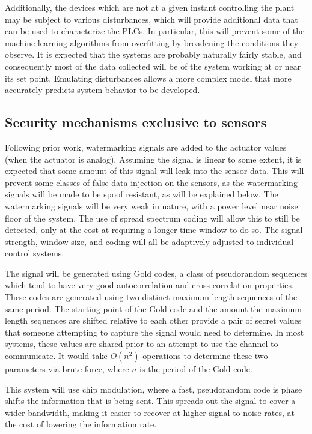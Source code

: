 \documentclass[10pt,twocolumn]{IEEEtran}
\begin{document}
Additionally, the devices which are not at a given instant controlling the plant may be subject to various disturbances, which will provide additional data that can be used to characterize the PLCs.
In particular, this will prevent some of the machine learning algorithms from overfitting by broadening the conditions they observe.
It is expected that the systems are probably naturally fairly stable, and consequently most of the data collected will be of the system working at or near its set point.
Emulating disturbances allows a more complex model that more accurately predicts system behavior to be developed.

\subsection{Security mechanisms exclusive to sensors}
Following prior work, watermarking signals are added to the actuator values (when the actuator is analog).
Assuming the signal is linear to some extent, it is expected that some amount of this signal will leak into the sensor data.
This will prevent some classes of false data injection on the sensors, as the watermarking signals will be made to be spoof resistant, as will be explained below.
The watermarking signals will be very weak in nature, with a power level near noise floor of the system.
The use of spread spectrum coding will allow this to still be detected, only at the cost at requiring a longer time window to do so.
The signal strength, window size, and coding will all be adaptively adjusted to individual control systems.

The signal will be generated using Gold codes, a class of pseudorandom sequences which tend to have very good autocorrelation and cross correlation properties.
These codes are generated using two distinct maximum length sequences of the same period.
The starting point of the Gold code and the amount the maximum length sequences are shifted relative to each other provide a pair of secret values that someone attempting to capture the signal would need to determine.
In most systems, these values are shared prior to an attempt to use the channel to communicate.
It would take $O(n^2)$ operations to determine these two parameters via brute force, where $n$ is the period of the Gold code.

This system will use chip modulation, where a fast, pseudorandom code is phase shifts the information that is being sent.
This spreads out the signal to cover a wider bandwidth, making it easier to recover at higher signal to noise rates, at the cost of lowering the information rate.
\end{document}
